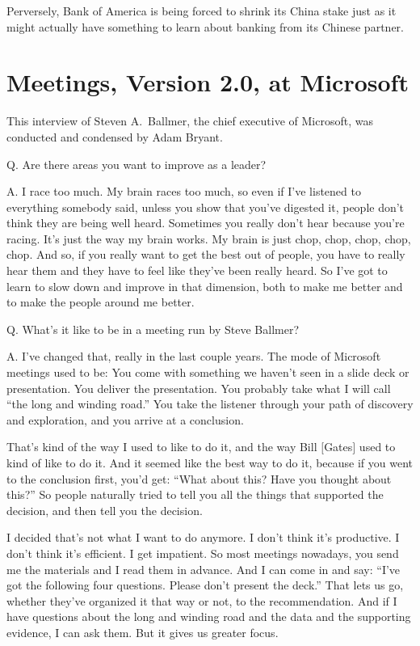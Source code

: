 \documentclass[12pt,a4paper,onecolumn]{article}
\begin{document}
Perversely, Bank of America is being forced to shrink its China stake just as it might actually have something to learn about banking from its Chinese partner.

\section{Meetings, Version 2.0, at Microsoft}

This interview of Steven A.~Ballmer, the chief executive of Microsoft, was conducted and condensed
by Adam Bryant.

\textsf{Q. Are there areas you want to improve as a leader?}

A. I race too much. My brain races too much, so even if I've listened to everything somebody said,
unless you show that you've digested it, people don't think they are being well heard. Sometimes you
really don't hear because you're racing. It's just the way my brain works. My brain is just chop,
chop, chop, chop, chop. And so, if you really want to get the best out of people, you have to really
hear them and they have to feel like they've been really heard. So I've got to learn to slow down
and improve in that dimension, both to make me better and to make the people around me better.

\textsf{Q. What's it like to be in a meeting run by Steve Ballmer?}

A. I've changed that, really in the last couple years. The mode of Microsoft meetings used to be:
You come with something we haven't seen in a slide deck or presentation. You deliver the
presentation. You probably take what I will call ``the long and winding road.'' You take the
listener through your path of discovery and exploration, and you arrive at a conclusion.

That's kind of the way I used to like to do it, and the way Bill $[$Gates$]$ used to kind of like to
do it. And it seemed like the best way to do it, because if you went to the conclusion first, you'd
get: ``What about this? Have you thought about this?'' So people naturally tried to tell you all the
things that supported the decision, and then tell you the decision.

I decided that's not what I want to do anymore. I don't think it's productive. I don't think it's
efficient. I get impatient. So most meetings nowadays, you send me the materials and I read them in
advance. And I can come in and say: ``I've got the following four questions. Please don't present
the deck.'' That lets us go, whether they've organized it that way or not, to the recommendation.
And if I have questions about the long and winding road and the data and the supporting evidence, I
can ask them. But it gives us greater focus.
\end{document}
